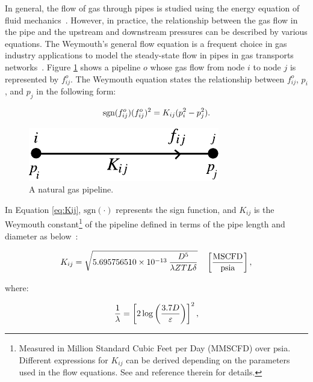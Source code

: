 In general, the flow of gas through pipes is studied using the energy equation of fluid mechanics~\cite{Banda2006}. However, in practice, the relationship between the gas flow in the pipe and the upstream and downstream pressures can be described by various equations. The Weymouth's general flow equation is a frequent choice in gas industry applications to model the steady-state flow in pipes in gas transports networks~\cite{Woldeyohannes2011}. Figure \ref{fig:pipeline} shows a pipeline $o$ whose gas flow from node $i$ to node $j$ is represented by $f_{ij}^o$. The Weymouth equation states the relationship between $f_{ij}^o$, $p_i$, and $p_j$ in the following form:

\begin{equation}
	\label{eq:Weymouth_eq1}
	\text{sgn}(f_{ij}^o)(f_{ij}^o)^2 = K_{ij}(p_i^2-p_j^2). 
	\vspace{0.3cm}
\end{equation}

\begin{figure}[!ht]
	\centering
	\includegraphics[scale=1]{Figures/Pipeline}
	\caption{A natural gas pipeline.}	
	\label{fig:pipeline}
\end{figure}

In Equation \ref{eq:Kij}, $\text{sgn}(\cdot)$ represents the sign function, and $K_{ij}$ is the  Weymouth constant\footnote{Measured in Million Standard Cubic Feet per Day (MMSCFD) over psia. Different expressions for $K_{ij}$ can be derived depending on the parameters used in the flow equations. See \cite{Woldeyohannes2011} and reference therein for details.} of the pipeline defined in terms of the pipe length and diameter as below~\cite{Wolf2000}:

\begin{equation}
	\label{eq:Kij}
	K_{ij} = \sqrt{5.695756510\times 10^{-13}\:\frac{D^5}{\lambda Z T L\delta}}\quad \left[\frac{\text{MSCFD}}{\text{psia}}\right],
	\vspace{0.3cm}
\end{equation}

where: 

\begin{equation}
	\label{eq:lambda_Kij}
	\frac{1}{\lambda} = \left[2\log \left(\frac{3.7D}{\varepsilon}\right)\right]^2,
	\vspace{0.3cm}
\end{equation}

